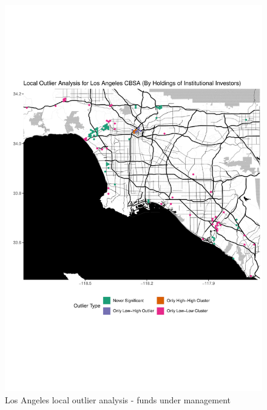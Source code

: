 \begin{figure}
	\centering
	\includegraphics[width=1\linewidth]{Figures/ChapterIV/LA_Money_LO}
	\caption[Los Angeles CBSA Local Outlier Analysis - Funds Under Management 2013-2018]{Los Angeles local outlier analysis - funds under management}
	\label{fig:LAlocaloutlier}
\end{figure}

